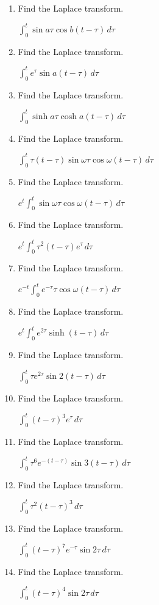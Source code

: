 \documentclass{ximera}
\begin{document}
\begin{problem}\label{exer:8.6.2}

\begin{enumerate}

\item Find the Laplace transform.

$\int_0^t\sin a\tau\cos b(t-\tau)\, d\tau$

\item Find the Laplace transform.

$\int_0^t e^\tau\sin a(t-\tau)\,d\tau$ 

\item Find the Laplace transform. 

$\int_0^t\sinh a\tau\cosh a(t-\tau)\,d\tau$

\item Find the Laplace transform. 

$\int_0^t\tau(t-\tau)\sin \omega\tau\cos\omega
(t-\tau)\,d\tau$

\item Find the Laplace transform. 

$e^t\int_0^t\sin\omega\tau
\cos\omega (t-\tau)\,d\tau$

\item Find the Laplace transform. 

$e^t\int_0^t\tau^2 (t-\tau)e^\tau\,d\tau$

\item Find the Laplace transform. 

$e^{-t}\int_0^t e^{-\tau}\tau\cos\omega (t-\tau)\,d\tau$

\item Find the Laplace transform. 

$e^t\int_0^t e^{2\tau}\sinh
(t-\tau)\,d\tau$

\item Find the Laplace transform. 

$\int_0^t\tau e^{2\tau}\sin
2(t-\tau)\,d\tau$

\item Find the Laplace transform. 

$\int_0^t (t-\tau)^3 e^\tau\, d\tau$

\item Find the Laplace transform. 

$\int_0^t\tau^6
e^{-(t-\tau)}\sin 3(t-\tau)\,d\tau$

\item Find the Laplace transform. 

$\int_0^t\tau^2 (t-\tau)^3\,
d\tau$

\item Find the Laplace transform. 

$\int_0^t (t-\tau)^7 e^{-\tau}
\sin 2\tau\,d\tau$

\item Find the Laplace transform. 

$\int_0^t (t-\tau)^4\sin
2\tau\,d\tau$
\end{enumerate}
\end{problem}
\end{document}
